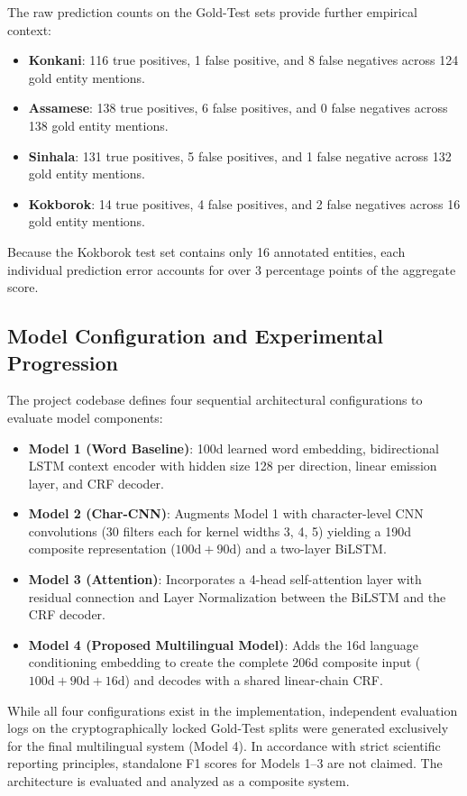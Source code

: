 \documentclass[pdflatex,sn-mathphys-num]{sn-jnl}
\begin{document}
The raw prediction counts on the Gold-Test sets provide further empirical context:
\begin{itemize}
    \item \textbf{Konkani}: 116 true positives, 1 false positive, and 8 false negatives across 124 gold entity mentions.
    \item \textbf{Assamese}: 138 true positives, 6 false positives, and 0 false negatives across 138 gold entity mentions.
    \item \textbf{Sinhala}: 131 true positives, 5 false positives, and 1 false negative across 132 gold entity mentions.
    \item \textbf{Kokborok}: 14 true positives, 4 false positives, and 2 false negatives across 16 gold entity mentions.
\end{itemize}
Because the Kokborok test set contains only 16 annotated entities, each individual prediction error accounts for over 3 percentage points of the aggregate score.

\subsection{Model Configuration and Experimental Progression}\label{subsec:ablation_progression}

The project codebase defines four sequential architectural configurations to evaluate model components:
\begin{itemize}
    \item \textbf{Model 1 (Word Baseline)}: 100d learned word embedding, bidirectional LSTM context encoder with hidden size 128 per direction, linear emission layer, and CRF decoder.
    \item \textbf{Model 2 (Char-CNN)}: Augments Model 1 with character-level CNN convolutions (30 filters each for kernel widths 3, 4, 5) yielding a 190d composite representation ($100\text{d} + 90\text{d}$) and a two-layer BiLSTM.
    \item \textbf{Model 3 (Attention)}: Incorporates a 4-head self-attention layer with residual connection and Layer Normalization between the BiLSTM and the CRF decoder.
    \item \textbf{Model 4 (Proposed Multilingual Model)}: Adds the 16d language conditioning embedding to create the complete 206d composite input ($100\text{d} + 90\text{d} + 16\text{d}$) and decodes with a shared linear-chain CRF.
\end{itemize}

While all four configurations exist in the implementation, independent evaluation logs on the cryptographically locked Gold-Test splits were generated exclusively for the final multilingual system (Model 4). In accordance with strict scientific reporting principles, standalone F1 scores for Models 1--3 are not claimed. The architecture is evaluated and analyzed as a composite system.
\end{document}
